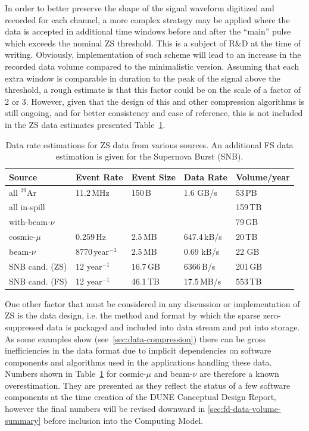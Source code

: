 In order to better preserve the shape of the signal waveform digitized and recorded for
each channel, a more complex strategy may be applied where the data is accepted in additional
time windows before and after the ``main'' pulse which exceeds the nominal ZS threshold. This
is a subject of R\&D at the time of writing. Obviously, implementation of such scheme will lead
to an increase in the recorded data volume compared to the minimalistic version. Assuming that
each extra window is comparable in duration to the peak of the signal above the threshold,
a rough estimate is that this factor could be on the scale of a factor of 2 or 3. However, given
that the design of this and other compression algorithms is still ongoing, and for better consistency
and ease of reference, this is not included in the ZS data estimates presented Table~\ref{tab:zs-volume}.
	
\begin{table}[ht!]
\centering
\begin{tabular}{| p{1.2in} | p{0.9in} | p{0.75in} | p{0.8in} | p{0.9in} |}		\hline		
Source & Event Rate & Event Size & Data Rate & Volume/year \\ \hline
all $^{39}$Ar & 11.2\,MHz & 150\,B & 1.6 GB/s &  53\,PB \\ \hline
all in-spill & & & & 159\,TB \\ \hline
with-beam-$\nu$ & & & & 79\,GB \\ \hline \hline
cosmic-$\mu$ & 0.259\,Hz &2.5\,MB & 647.4\,kB/s & 20\,TB \\	\hline
beam-$\nu$ & 8770\,year$^{-1}$ & 2.5\,MB & 0.69 kB/s & 22 GB \\ \hline \hline
SNB cand. (ZS) & 12 year$^{-1}$ & 16.7\,GB & 6366\,B/s & 201\,GB \\ \hline
SNB cand. (FS) & 12 year$^{-1}$ & 46.1\,TB & 17.5\,MB/s & 553\,TB \\ \hline
\end{tabular}
\caption{Data rate estimations for ZS data from various sources.
An additional FS data estimation is given for the Supernova Burst (SNB).}
\label{tab:zs-volume}
\end{table}

One other factor that must be considered in any discussion or implementation of ZS is the data design,
i.e. the method and format by which the sparse zero-suppressed data is packaged and included into
data stream and put into storage. As some examples show (see~\ref{sec:data-compression})
there can be gross inefficiencies in the data format due to implicit dependencies
on software components and algorithms used in the applications handling these data.
Numbers shown in Table~\ref{tab:zs-volume} for cosmic-$\mu$ and beam-$\nu$
are therefore a known overestimation. They are presented as they reflect the status
of a few software components at the time creation of the DUNE Conceptual Design Report,
however the final numbers will be revised downward in \ref{sec:fd-data-volume-summary}
before inclusion into the Computing Model.

